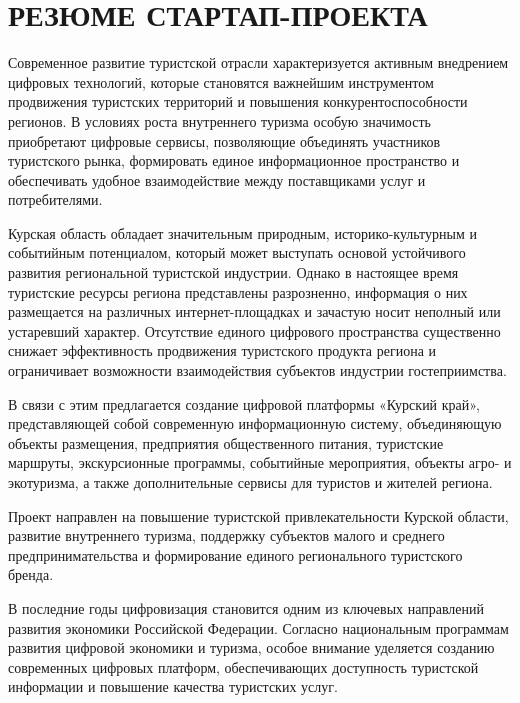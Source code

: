 \section*{РЕЗЮМЕ СТАРТАП-ПРОЕКТА}
Современное развитие туристской отрасли характеризуется активным внедрением цифровых технологий, которые становятся важнейшим инструментом продвижения туристских территорий и повышения конкурентоспособности регионов. В условиях роста внутреннего туризма особую значимость приобретают цифровые сервисы, позволяющие объединять участников туристского рынка, формировать единое информационное пространство и обеспечивать удобное взаимодействие между поставщиками услуг и потребителями.

Курская область обладает значительным природным, историко-культурным и событийным потенциалом, который может выступать основой устойчивого развития региональной туристской индустрии. Однако в настоящее время туристские ресурсы региона представлены разрозненно, информация о них размещается на различных интернет-площадках и зачастую носит неполный или устаревший характер. Отсутствие единого цифрового пространства существенно снижает эффективность продвижения туристского продукта региона и ограничивает возможности взаимодействия субъектов индустрии гостеприимства.

В связи с этим предлагается создание цифровой платформы «Курский край», представляющей собой современную информационную систему, объединяющую объекты размещения, предприятия общественного питания, туристские маршруты, экскурсионные программы, событийные мероприятия, объекты агро- и экотуризма, а также дополнительные сервисы для туристов и жителей региона.

Проект направлен на повышение туристской привлекательности Курской области, развитие внутреннего туризма, поддержку субъектов малого и среднего предпринимательства и формирование единого регионального туристского бренда.

В последние годы цифровизация становится одним из ключевых направлений развития экономики Российской Федерации. Согласно национальным программам развития цифровой экономики и туризма, особое внимание уделяется созданию современных цифровых платформ, обеспечивающих доступность туристской информации и повышение качества туристских услуг.


